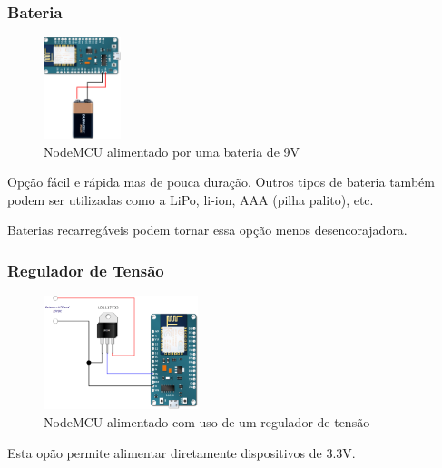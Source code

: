 \documentclass{beamer}
\begin{document}
\begin{frame}
\frametitle{Bateria}
\begin{minipage}{\textwidth}
	\begin{figure}[!ht]
		\centering
		\includegraphics[width=0.2\textwidth]{Power-ESP-12E-with-a-9V-Battery.png}
		\caption{NodeMCU alimentado por uma bateria de 9V}
		\label{fig:aligfgfmentacdffdaodffdg_usb}
	\end{figure}
	Opção fácil e rápida mas de pouca duração. Outros tipos de bateria também podem ser utilizadas como a LiPo, li-ion, AAA (pilha palito), etc.
	
	Baterias recarregáveis podem tornar essa opção menos desencorajadora.
\end{minipage}
\end{frame} 

\begin{frame}
	\frametitle{Regulador de Tensão}
	\begin{minipage}{\textwidth}
		\begin{figure}[!ht]
			\centering
			\includegraphics[width=0.4\textwidth]{Power-NodeMCU-with-LD33.png}
			\caption{NodeMCU alimentado com uso de um regulador de tensão}
			\label{fig:aligfgfmentacfdfddffdaodffdg_usb}
		\end{figure}
		Esta opão permite alimentar diretamente dispositivos de 3.3V. 
		
	\end{minipage}
\end{frame} 
\end{document}
